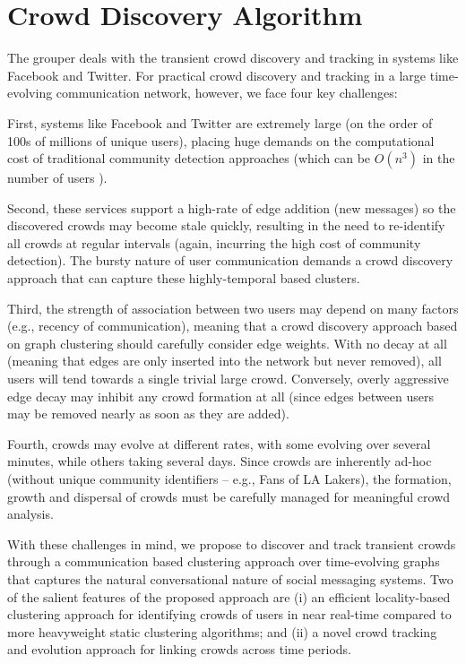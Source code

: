 \documentclass{sig-alternate}
\begin{document}
\section{Crowd Discovery Algorithm}
\label{sec:crowd_algorithm}
The grouper deals with the transient crowd discovery and tracking in systems like Facebook and Twitter. For practical crowd discovery and tracking in a large time-evolving communication network, however, we face four key challenges:

\begin{list}{}{\leftmargin= 0.3cm}

\item First, systems like Facebook and Twitter are extremely large (on the order
of 100s of millions of unique users), placing huge demands on the computational
cost of traditional community detection approaches (which can be $O(n^3)$ in the
number of users \cite{flake:cut-clustering}).

\item Second, these services support a high-rate of edge addition (new
messages) so the discovered crowds may become stale quickly, resulting in the need to
re-identify all crowds at regular intervals (again, incurring the high cost of
community detection). The bursty nature of user communication demands a crowd
discovery approach that can capture these highly-temporal based clusters.

\item Third, the strength of association between two users may depend on many
factors (e.g., recency of communication), meaning that a crowd discovery approach
based on graph clustering should carefully consider edge weights. With no decay
at all (meaning that edges are only inserted into the network but never removed),
all users will tend towards a single trivial large crowd. Conversely, overly
aggressive edge decay may inhibit any crowd formation at all (since edges between
users may be removed nearly as soon as they are added).

\item Fourth, crowds may evolve at different rates, with some evolving over
several minutes, while others taking several days. Since crowds are inherently
ad-hoc (without unique community identifiers -- e.g., Fans of LA Lakers), the
formation, growth and dispersal of crowds must be carefully managed for
meaningful crowd analysis.
\end{list}

With these challenges in mind, we propose to discover and track transient crowds
through a communication based clustering approach over time-evolving
graphs that captures the natural conversational nature of social messaging
systems. Two of the salient features of the proposed approach are (i) an
efficient locality-based clustering approach for identifying crowds of users in
near real-time compared to more heavyweight static clustering algorithms; and
(ii) a novel crowd tracking and evolution approach for linking crowds across time
periods.
\end{document}
